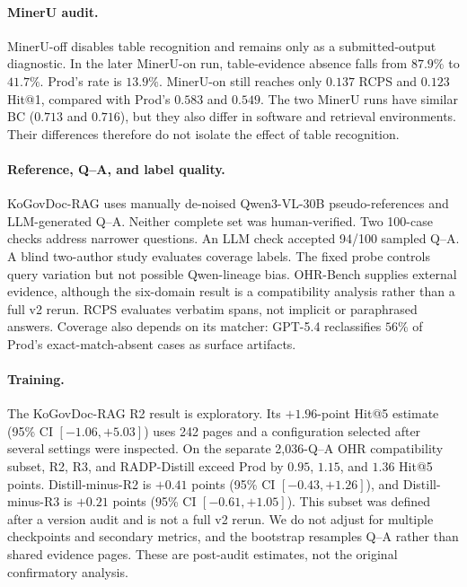 \documentclass[11pt]{article}
\newcommand{\rcps}{\textnormal{\textsc{RCPS}}}
\begin{document}
\paragraph{MinerU audit.} MinerU-off disables table recognition and remains only as a submitted-output diagnostic. In the later MinerU-on run, table-evidence absence falls from $87.9\%$ to $41.7\%$. Prod's rate is $13.9\%$. MinerU-on still reaches only $0.137$ \rcps{} and $0.123$ Hit@1, compared with Prod's $0.583$ and $0.549$. The two MinerU runs have similar BC ($0.713$ and $0.716$), but they also differ in software and retrieval environments. Their differences therefore do not isolate the effect of table recognition.

\paragraph{Reference, Q--A, and label quality.} KoGovDoc-RAG uses manually de-noised Qwen3-VL-30B pseudo-references and LLM-generated Q--A. Neither complete set was human-verified. Two 100-case checks address narrower questions. An LLM check accepted 94/100 sampled Q--A. A blind two-author study evaluates coverage labels. The fixed probe controls query variation but not possible Qwen-lineage bias. OHR-Bench supplies external evidence, although the six-domain result is a compatibility analysis rather than a full v2 rerun. \rcps{} evaluates verbatim spans, not implicit or paraphrased answers. Coverage also depends on its matcher: GPT-5.4 reclassifies $56\%$ of Prod's exact-match-absent cases as surface artifacts.

\paragraph{Training.} The KoGovDoc-RAG R2 result is exploratory. Its $+1.96$-point Hit@5 estimate (95\% CI $[-1.06,+5.03]$) uses 242 pages and a configuration selected after several settings were inspected. On the separate 2{,}036-Q--A OHR compatibility subset, R2, R3, and RADP-Distill exceed Prod by $0.95$, $1.15$, and $1.36$ Hit@5 points. Distill-minus-R2 is $+0.41$ points (95\% CI $[-0.43,+1.26]$), and Distill-minus-R3 is $+0.21$ points (95\% CI $[-0.61,+1.05]$). This subset was defined after a version audit and is not a full v2 rerun. We do not adjust for multiple checkpoints and secondary metrics, and the bootstrap resamples Q--A rather than shared evidence pages. These are post-audit estimates, not the original confirmatory analysis.
\end{document}
